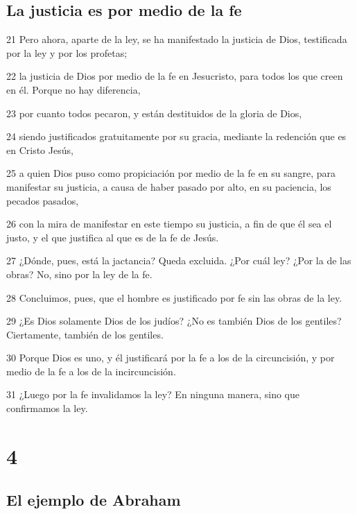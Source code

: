 \section*{La justicia es por medio de la fe}

\par 21 Pero ahora, aparte de la ley, se ha manifestado la justicia de Dios, testificada por la ley y por los profetas;
\par 22 la justicia de Dios por medio de la fe en Jesucristo, para todos los que creen en él. Porque no hay diferencia,
\par 23 por cuanto todos pecaron, y están destituidos de la gloria de Dios,
\par 24 siendo justificados gratuitamente por su gracia, mediante la redención que es en Cristo Jesús,
\par 25 a quien Dios puso como propiciación por medio de la fe en su sangre, para manifestar su justicia, a causa de haber pasado por alto, en su paciencia, los pecados pasados,
\par 26 con la mira de manifestar en este tiempo su justicia, a fin de que él sea el justo, y el que justifica al que es de la fe de Jesús.
\par 27 ¿Dónde, pues, está la jactancia? Queda excluida. ¿Por cuál ley? ¿Por la de las obras? No, sino por la ley de la fe.
\par 28 Concluimos, pues, que el hombre es justificado por fe sin las obras de la ley.
\par 29 ¿Es Dios solamente Dios de los judíos? ¿No es también Dios de los gentiles? Ciertamente, también de los gentiles.
\par 30 Porque Dios es uno, y él justificará por la fe a los de la circuncisión, y por medio de la fe a los de la incircuncisión.
\par 31 ¿Luego por la fe invalidamos la ley? En ninguna manera, sino que confirmamos la ley.

\chapter{4}

\section*{El ejemplo de Abraham}

